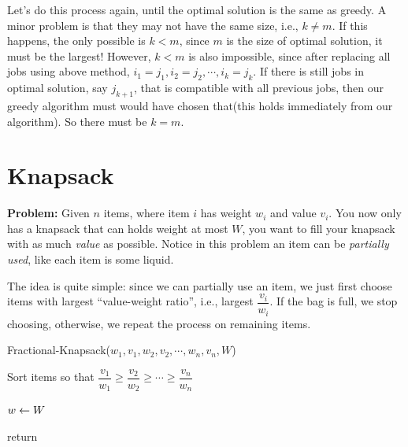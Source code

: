 \begin{spacing}{1.3}
    Let's do this process again, until the optimal solution is the same as greedy.
    A minor problem is that they may not have the same size, i.e., $k\ne m$. 
    If this happens, the only possible is $k<m$, since $m$ is the size of optimal solution, 
    it must be the largest! However, $k<m$ is also impossible, since after replacing 
    all jobs using above method, $i_1=j_1, i_2=j_2,\cdots, i_k=j_k$. If there is 
    still jobs in optimal solution, say $j_{k+1}$, that is compatible with all previous 
    jobs, then our greedy algorithm must would have chosen that(this holds immediately 
    from our algorithm). So there must be $k=m$.


    \vspace{0.5in}
    \section{Knapsack}

    {\bf Problem:} Given $n$ items, where item $i$ has weight $w_i$ and value $v_i$.
    You now only has a knapsack that can holds weight at most $W$, you want to fill 
    your knapsack with as much {\it value} as possible. Notice in this problem an item 
    can be {\it partially used}, like each item is some liquid.

    The idea is quite simple: since we can partially use an item, we just first choose 
    items with largest ``value-weight ratio'', i.e., largest $\dfrac{v_i}{w_i}$.
    If the bag is full, we stop choosing, otherwise, we repeat the process 
    on remaining items.

    \begin{algorithm*}
        \caption{Fractional-Knapsack($w_1, v_1, w_2, v_2, \cdots, w_n, v_n, W$)}
        Sort items so that $\dfrac{v_1}{w_1}\ge \dfrac{v_2}{w_2}\ge \cdots \ge \dfrac{v_n}{w_n}$

        $w\leftarrow W$\qquad {}

        return
    \end{algorithm*}


\end{spacing}
